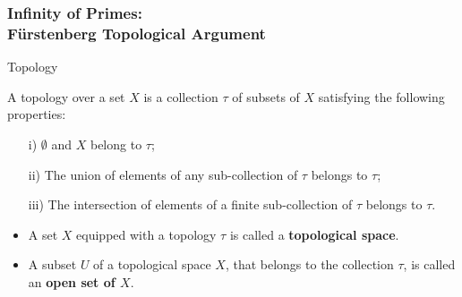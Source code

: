 \documentclass[10pt]{beamer}
\begin{document}
\begin{frame}
  \frametitle{Infinity of Primes: \\ F\"{u}rstenberg Topological Argument} 

  \begin{block}{Topology}

    A topology over a set $X$ is a collection
    $\tau$ of subsets of $X$ satisfying the following properties:
    \begin{itemize}
    \item[i)] $\emptyset$ and $X$ belong to $\tau$;
    \item[ii)] The union of elements of any sub-collection of $\tau$ belongs to $\tau$;
     \item[iii)] The intersection of elements of a finite sub-collection of $\tau$ belongs to $\tau$.
    \end{itemize}
\begin{itemize}
    \item A set $X$ equipped with a topology $\tau$ is called a
      \textbf{topological space}.
      \item A subset $U$ of a topological space $X$, that belongs to the collection $\tau$, is called
        an \textbf{open set of $X$}.
\end{itemize}
    
    \end{block}
   

 \end{frame} 

\end{document}
